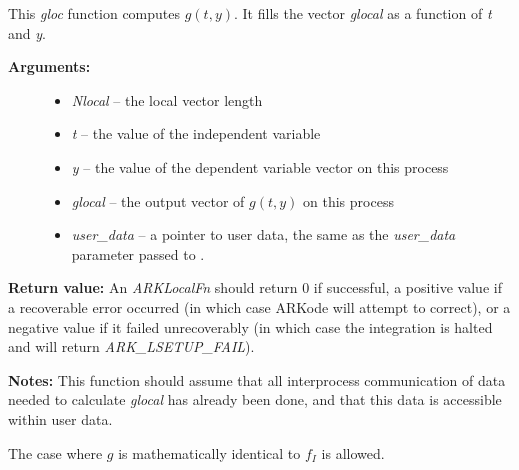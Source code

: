 \documentclass[letterpaper,10pt,english]{sphinxmanual}
\begin{document}
\begin{fulllineitems}
\label{c_interface/Preconditioners:c.ARKLocalFn}
This \emph{gloc} function computes \(g(t,y)\).  It
fills the vector \emph{glocal} as a function of \emph{t} and \emph{y}.
\begin{description}
\item[{\textbf{Arguments:}}] \leavevmode\begin{itemize}
\item {} 
\emph{Nlocal} -- the local vector length

\item {} 
\emph{t} -- the value of the independent variable

\item {} 
\emph{y} -- the value of the dependent variable vector on this process

\item {} 
\emph{glocal} -- the output vector of \(g(t,y)\) on this process

\item {} 
\emph{user\_data} -- a pointer to user data, the same as the
\emph{user\_data} parameter passed to {\hyperref[c_interface/User_callable:c.ARKodeSetUserData]{\emph{}}}.

\end{itemize}

\end{description}

\textbf{Return value:}
An \emph{ARKLocalFn} should return 0 if successful, a positive value if
a recoverable error occurred (in which case ARKode will attempt to
correct), or a negative value if it failed unrecoverably (in which
case the integration is halted and {\hyperref[c_interface/User_callable:c.ARKode]{\emph{}}} will return
\emph{ARK\_LSETUP\_FAIL}).

\textbf{Notes:}  This function should assume that all interprocess
communication of data needed to calculate \emph{glocal} has already been
done, and that this data is accessible within user data.

The case where \(g\) is mathematically identical to \(f_I\)
is allowed.

\end{fulllineitems}

\end{document}
